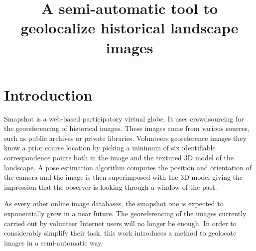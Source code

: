 \documentclass[fleqn,10pt,lineno]{wlpeerj} %
\title{A semi-automatic tool to geolocalize historical landscape images}
\begin{document}
\flushbottom
\maketitle
\thispagestyle{empty}

\section*{Introduction}
Smapshot is a web-based participatory virtual globe. It uses crowdsourcing for 
the georeferencing of historical images. These images come from various sources, 
such as public archives or private libraries. Volunteers georeference images 
they know a prior coarse location by picking a minimum of six identifiable 
correspondence points both in the image and the textured 3D model of the landscape. 
A pose estimation algorithm computes the position and orientation of the camera 
and the image is then superimposed  with the 3D model giving the impression that 
the observer is looking through a window of the past.

As every other online image databases, the smapshot one is expected to 
exponentially grow in a near future. The georeferencing of the images currently 
carried out by volunteer Internet users will no longer be enough.
In order to considerably simplify their task, this work introduces a method to
geolocate images in a semi-automatic way.

\end{document}
